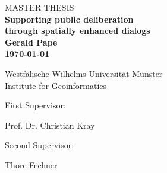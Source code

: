 \onecolumn

\thispagestyle{empty}


\begin{center} %
 
\vspace*{5cm}

\textsc{\large MASTER THESIS}\\[1cm] %


{ \Huge \bfseries Supporting public deliberation\\through spatially enhanced dialogs}\\[2.5cm]
 
{\LARGE \textbf{Gerald Pape}}\\[1.5cm]
 
{\LARGE \textbf{\today}}\\[5cm]

\end{center}

{\Large
Westf{\"a}lische Wilhelms-Universit{\"a}t M{\"u}nster\\[0.3cm]
Institute for Geoinformatics\\[0.7cm]

\parbox{3.5cm}{First Supervisor:} Prof. Dr. Christian Kray\\[0.3cm]
\parbox{3.5cm}{Second Supervisor:} Thore Fechner
}







\vfill %


